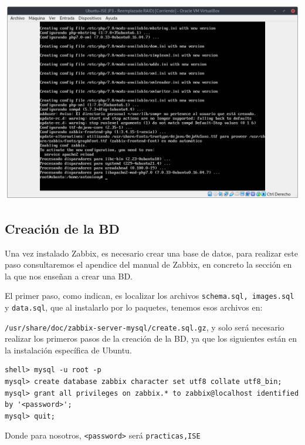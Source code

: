 \documentclass[12pt, spanish]{article}
\begin{document}
\begin{center}
\includegraphics[scale=0.45]{aviso_instalacion.png}
\end{center}


\subsection{Creación de la BD}

Una vez instalado Zabbix, es necesario crear una base de datos, para realizar este paso consultaremos el apendice del manual de Zabbix, en concreto la sección en la que nos enseñan a crear una BD\cite{zabbix_apendice_BD}.

El primer paso, como indican, es localizar los archivos \texttt{schema.sql, images.sql} y \texttt{data.sql}, que al instalarlo por lo paquetes, tenemos esos archivos en:

\texttt{/usr/share/doc/zabbix-server-mysql/create.sql.gz}, y solo será necesario realizar los primeros pasos de la creación de la BD, ya que los siguientes están en la instalación específica de Ubuntu.


\begin{verbatim}
shell> mysql -u root -p
mysql> create database zabbix character set utf8 collate utf8_bin;
mysql> grant all privileges on zabbix.* to zabbix@localhost identified by '<password>';
mysql> quit;
\end{verbatim}



Donde para nosotros, \texttt{<password>} será \texttt{practicas,ISE}
\end{document}
